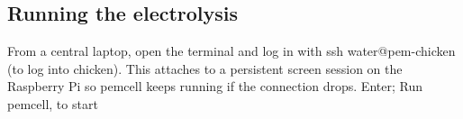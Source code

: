 \documentclass{ol-softwaremanual}
\begin{document}
\begin{table}[H]
\centering
\caption{PEM enrichment data capture table}
\label{tab:pem_enrichment_data}

\renewcommand{\arraystretch}{1.6}

\end{table}
\subsection{Running the electrolysis}
From a central laptop, open the terminal and log in with ssh water@pem-chicken (to log into chicken). This attaches to a persistent screen session on the Raspberry Pi so pemcell keeps running if the connection drops.
Enter; Run pemcell, to start
\end{document}
